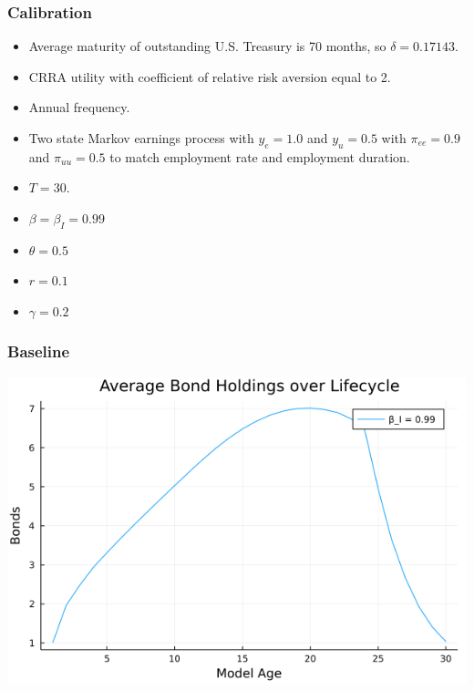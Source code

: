 \documentclass{beamer}
\begin{document}
\begin{frame}
\frametitle{Calibration}

\begin{itemize}[<+->]

\item Average maturity of outstanding U.S. Treasury is 70 months, so $\delta = 0.17143$. \hyperlink{delta}{ }
\item CRRA utility with coefficient of relative risk aversion equal to 2.
\item Annual frequency.
\item Two state Markov earnings process with $y_e = 1.0$ and $y_u = 0.5$ with $\pi_{ee} = 0.9$ and $\pi_{uu} = 0.5$ to match employment rate and employment duration.
\item $T = 30$.
\item $\beta = \beta_I = 0.99$
\item $\theta = 0.5$
\item $r = 0.1$
\item $\gamma =0.2$
\bigskip

\end{itemize}

\end{frame}








\begin{frame}
\frametitle{Baseline}

\begin{center}
\includegraphics[scale = 0.5]{bond}
\end{center}

\end{frame}
\end{document}

